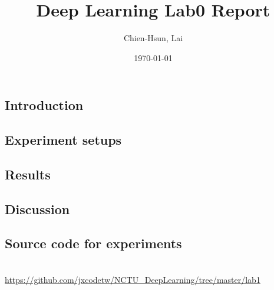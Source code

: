 \documentclass[A4]{article}
\title{Deep Learning Lab0 Report}
\author{Chien-Hsun, Lai}
\date{\today}
\begin{document}
\maketitle

\section{Introduction}
\section{Experiment setups}
%

\section{Results}
\section{Discussion}
\begin{appendices}
\chapter{Source code for experiments}\\
\url{https://github.com/jxcodetw/NCTU_DeepLearning/tree/master/lab1}
\end{appendices}
\end{document}
